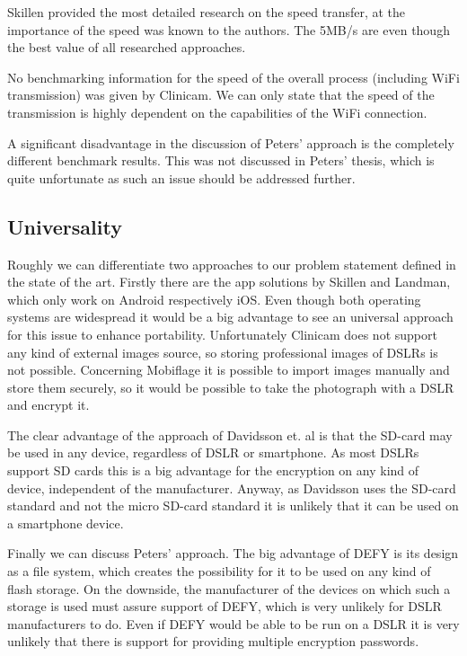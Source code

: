 \documentclass[12pt,a4paper,titlepage,oneside]{scrartcl}
\begin{document}
Skillen provided the most detailed research on the speed transfer, at the importance of the speed was known to the authors.
The 5MB/s are even though the best value of all researched approaches.

No benchmarking information for the speed of the overall process (including WiFi transmission) was given by Clinicam.
We can only state that the speed of the transmission is highly dependent on the capabilities of the WiFi connection.

A significant disadvantage in the discussion of Peters' approach is the completely different benchmark results.
This was not discussed in Peters' thesis, which is quite unfortunate as such an issue should be addressed further.

\subsection{Universality}
Roughly we can differentiate two approaches to our problem statement defined in the state of the art.
Firstly there are the app solutions by Skillen and Landman, which only work on Android respectively iOS.
Even though both operating systems are widespread it would be a big advantage to see an universal approach for this issue to enhance portability.
Unfortunately Clinicam does not support any kind of external images source, so storing professional images of DSLRs is not possible.
Concerning Mobiflage it is possible to import images manually and store them securely, so it would be possible to take the photograph with a DSLR and encrypt it.

The clear advantage of the approach of Davidsson et. al \cite{Davidsson2016} is that the SD-card may be used in any device, regardless of DSLR or smartphone.
As most DSLRs support SD cards this is a big advantage for the encryption on any kind of device, independent of the manufacturer.
Anyway, as Davidsson uses the SD-card standard and not the micro SD-card standard it is unlikely that it can be used on a smartphone device.

Finally we can discuss Peters' approach.
The big advantage of DEFY is its design as a file system, which creates the possibility for it to be used on any kind of flash storage.
On the downside, the manufacturer of the devices on which such a storage is used must assure support of DEFY, which is very unlikely for DSLR manufacturers to do.
Even if DEFY would be able to be run on a DSLR it is very unlikely that there is support for providing multiple encryption passwords.
\end{document}
